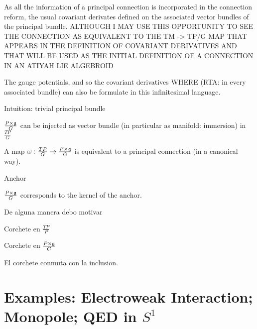 As all the information of a principal connection is incorporated in the connection reform, the usual covariant derivates defined on the associated vector bundles of the principal bundle. ALTHOUGH I MAY USE THIS OPPORTUNITY TO SEE THE CONNECTION AS EQUIVALENT TO THE TM -> TP/G MAP THAT APPEARS IN THE DEFINITION OF COVARIANT DERIVATIVES AND THAT WILL BE USED AS THE INITIAL DEFINITION OF A CONNECTION IN AN ATIYAH LIE ALGEBROID


The gauge potentials, and so the covariant derivatives WHERE (RTA: in every associated bundle) can also be formulate in this infinitesimal language. 

Intuition: trivial principal bundle

\begin{proposition}
$\frac{P \times \mathfrak{g}}{G}$ can be injected as vector bundle (in particular as manifold: immersion) in $\frac{TP}{G}$
\end{proposition}

\begin{theorem}
A map $\omega:\frac{TP}{G} \to \frac{P \times \mathfrak{g}}{G}$ is equivalent to a principal connection (in a canonical way).
\end{theorem}

\begin{definition}
Anchor
\end{definition}

\begin{proposition}
$\frac{P \times \mathfrak{g}}{G}$ corresponds to the kernel of the anchor.
\end{proposition}

De alguna manera debo motivar 

\begin{definition}
Corchete en $\frac{TP}{P}$
\end{definition}

\begin{definition}
Corchete en $\frac{P \times \mathfrak{g}}{G}$
\end{definition}

\begin{proposition}
El corchete conmuta con la inclusion.
\end{proposition}



\section{Examples: Electroweak Interaction; Monopole; QED in $S^1$}


